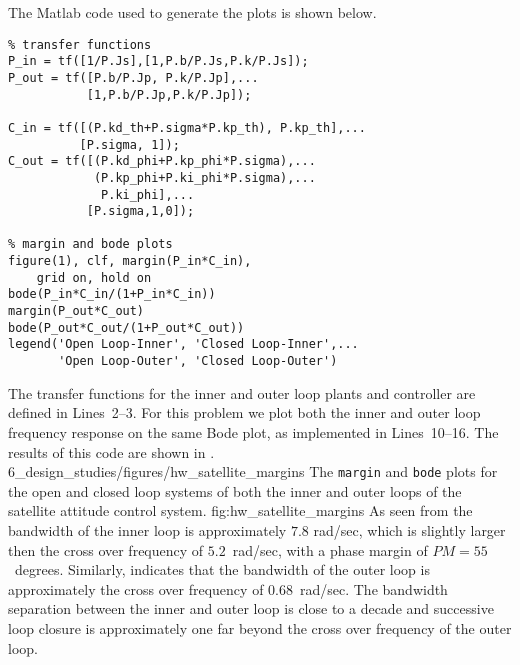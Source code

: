 
The Matlab code used to generate the plots is shown below.
\begin{lstlisting}
% transfer functions
P_in = tf([1/P.Js],[1,P.b/P.Js,P.k/P.Js]);
P_out = tf([P.b/P.Jp, P.k/P.Jp],...
           [1,P.b/P.Jp,P.k/P.Jp]);

C_in = tf([(P.kd_th+P.sigma*P.kp_th), P.kp_th],...
          [P.sigma, 1]);
C_out = tf([(P.kd_phi+P.kp_phi*P.sigma),...
            (P.kp_phi+P.ki_phi*P.sigma),...
             P.ki_phi],...
           [P.sigma,1,0]);

% margin and bode plots 
figure(1), clf, margin(P_in*C_in), 
	grid on, hold on
bode(P_in*C_in/(1+P_in*C_in)) 
margin(P_out*C_out)
bode(P_out*C_out/(1+P_out*C_out))
legend('Open Loop-Inner', 'Closed Loop-Inner',...
       'Open Loop-Outer', 'Closed Loop-Outer')
\end{lstlisting}

The transfer functions for the inner and outer loop plants and controller are defined in Lines~2--3.  For this problem we plot both the inner and outer loop frequency response on the same Bode plot, as implemented in Lines~10--16. The results of this code are shown in .
	{6_design_studies/figures/hw_satellite_margins}
	{The {\tt margin} and {\tt bode} plots for the open and closed loop systems of both the inner and outer loops of the satellite attitude control system.}
	{fig:hw_satellite_margins} 
As seen from  the bandwidth of the inner loop is approximately $7.8$ rad/sec, which is slightly larger then the cross over frequency of $5.2$~rad/sec, with a phase margin of $PM=55$~degrees.  
%
Similarly,  indicates that the bandwidth of the outer loop is approximately the cross over frequency of $0.68$~rad/sec.
%
The bandwidth separation between the inner and outer loop is close to a decade and successive loop closure is approximately one far beyond the cross over frequency of the outer loop.

